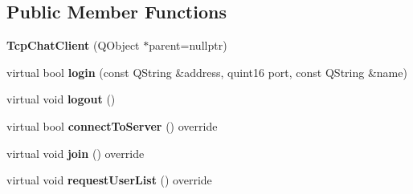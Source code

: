 \subsection*{Public Member Functions}
\begin{DoxyCompactItemize}
\item 
\hypertarget{classSimpleChat_1_1TcpChatClient_acd13e1bf8749dd0395e51ceabc7fdaf5}{{\bfseries Tcp\-Chat\-Client} (Q\-Object $\ast$parent=nullptr)}\label{classSimpleChat_1_1TcpChatClient_acd13e1bf8749dd0395e51ceabc7fdaf5}

\item 
\hypertarget{classSimpleChat_1_1TcpChatClient_a5f6302e6e92f8fc60721d5f042a2bd0a}{virtual bool {\bfseries login} (const Q\-String \&address, quint16 port, const Q\-String \&name)}\label{classSimpleChat_1_1TcpChatClient_a5f6302e6e92f8fc60721d5f042a2bd0a}

\item 
\hypertarget{classSimpleChat_1_1TcpChatClient_a7d582f1bee13aeaf77829fcdfef1cca4}{virtual void {\bfseries logout} ()}\label{classSimpleChat_1_1TcpChatClient_a7d582f1bee13aeaf77829fcdfef1cca4}

\item 
\hypertarget{classSimpleChat_1_1TcpChatClient_a4140c1693b4b675a4510f39ae51f593c}{virtual bool {\bfseries connect\-To\-Server} () override}\label{classSimpleChat_1_1TcpChatClient_a4140c1693b4b675a4510f39ae51f593c}

\item 
\hypertarget{classSimpleChat_1_1TcpChatClient_aef8015e0b6b273e671e7dcfd56dda837}{virtual void {\bfseries join} () override}\label{classSimpleChat_1_1TcpChatClient_aef8015e0b6b273e671e7dcfd56dda837}

\item 
\hypertarget{classSimpleChat_1_1TcpChatClient_abd27db3215c87dad68dbd2fd3c801ab8}{virtual void {\bfseries request\-User\-List} () override}\label{classSimpleChat_1_1TcpChatClient_abd27db3215c87dad68dbd2fd3c801ab8}

\end{DoxyCompactItemize}

